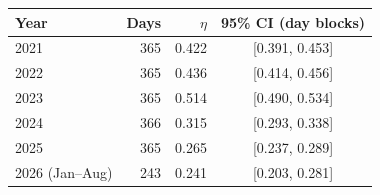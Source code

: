 \begin{tabular}{lrrc}
\toprule
Year & Days & \(\eta\) & 95\% CI (day blocks) \\
\midrule
2021 & 365 & 0.422 & [0.391, 0.453] \\
2022 & 365 & 0.436 & [0.414, 0.456] \\
2023 & 365 & 0.514 & [0.490, 0.534] \\
2024 & 366 & 0.315 & [0.293, 0.338] \\
2025 & 365 & 0.265 & [0.237, 0.289] \\
2026 (Jan--Aug) & 243 & 0.241 & [0.203, 0.281] \\
\bottomrule
\end{tabular}
